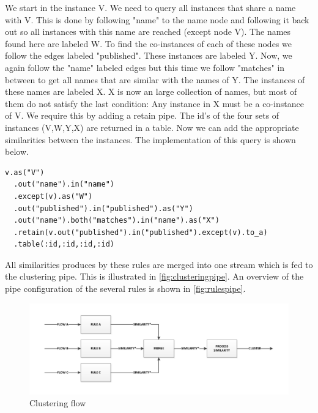 We start in the instance V. We need to query all instances that share a name with V. This is done by following "name" to the name node and following it back out so all instances with this name are reached (except node V). The names found here are labeled W. To find the co-instances of each of these nodes we follow the edges labeled "published". These instances are labeled Y. Now, we again follow the "name" labeled edges but this time we follow "matches" in between to get all names that are similar with the names of Y. The instances of these names are labeled X. X is now an large collection of names, but most of them do not satisfy the last condition: Any instance in X must be a co-instance of V. We require this by adding a retain pipe. The id's of the four sets of instances (V,W,Y,X) are returned in a table. Now we can add the appropriate similarities between the instances. The implementation of this query is shown below.

\begin{verbatim}
v.as("V")
  .out("name").in("name")
  .except(v).as("W")
  .out("published").in("published").as("Y")
  .out("name").both("matches").in("name").as("X")
  .retain(v.out("published").in("published").except(v).to_a)
  .table(:id,:id,:id,:id)
\end{verbatim}

All similarities produces by these rules are merged into one stream which is fed to the clustering pipe. This is illustrated in \autoref{fig:clusteringpipe}. An overview of the pipe configuration of the several rules is shown in \autoref{fig:rulespipe}.

\begin{figure}[htb]
	\centering
		\includegraphics[width=1\textwidth]{fig/clusteringpipe}
	\caption{Clustering flow}
	\label{fig:clusteringpipe}
\end{figure}

